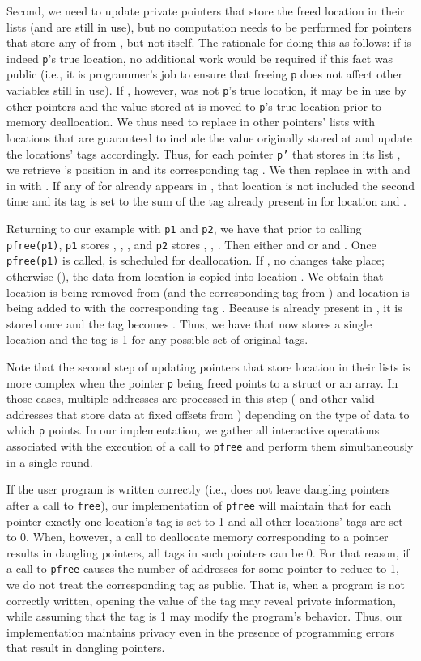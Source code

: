 \documentclass[11pt]{article}
\begin{document}
Second, we need to update private pointers that store the freed location
 in their lists (and are still in use), but no computation needs to
be performed for pointers that store any of 
from , but not  itself. The rationale for doing this as follows:
if  is indeed \texttt{p}'s true location, no additional work would
be required if this fact was public (i.e., it is programmer's job to ensure
that freeing \texttt{p} does not affect other variables still in use). If
, however, was not \texttt{p}'s true location, it may be in use by
other pointers and the value stored at  is moved to \texttt{p}'s
true location prior to memory deallocation. We thus need to replace 
in other pointers' lists with locations that are guaranteed to include the
value originally stored at  and update the locations' tags
accordingly. Thus, for each pointer \texttt{p'} that stores  in its
list , we retrieve 's position  in  and its
corresponding tag . We then replace  in  with
 and  in  with
. If any of
 for  already appears in , that
location is not included the second time and its tag is set to the sum of
the tag already present in  for location  and .

Returning to our example with \texttt{p1} and \texttt{p2}, we have that
prior to calling \texttt{pfree(p1)}, \texttt{p1} stores , , , and \texttt{p2} stores , , . Then either  and  or  and . Once
\texttt{pfree(p1)} is called,  is scheduled for deallocation. If
, no changes take place; otherwise (), the data from
location  is copied into location . We obtain that location
 is being removed from  (and the corresponding tag  from
) and location  is being added to  with the corresponding
tag . Because  is already present in , it is
stored once and the tag becomes . Thus, we have that
 now stores a single location and the tag is 1 for any possible set of
original tags. 

Note that the second step of updating pointers that store location 
in their lists is more complex when the pointer \texttt{p} being freed
points to a struct or an array. In those cases, multiple addresses are
processed in this step ( and other valid addresses that store data
at fixed offsets from ) depending on the type of data to which
\texttt{p} points. In our implementation, we gather all interactive
operations associated with the execution of a call to \texttt{pfree} and
perform them simultaneously in a single round.

If the user program is written correctly (i.e., does not leave dangling
pointers after a call to \texttt{free}), our implementation of
\texttt{pfree} will maintain that for each pointer exactly one location's
tag is set to 1 and all other locations' tags are set to 0. When, however, a
call to deallocate memory corresponding to a pointer results in dangling
pointers, all tags in such pointers can be 0. For that reason, if a call to
\texttt{pfree} causes the number of addresses for some pointer to reduce
to 1, we do not treat the corresponding tag as public. That is, when a
program is not correctly written, opening the value of the tag may reveal
private information, while assuming that the tag is 1 may modify the program's
behavior. Thus, our implementation maintains privacy even in the presence of
programming errors that result in dangling pointers.
\end{document}
